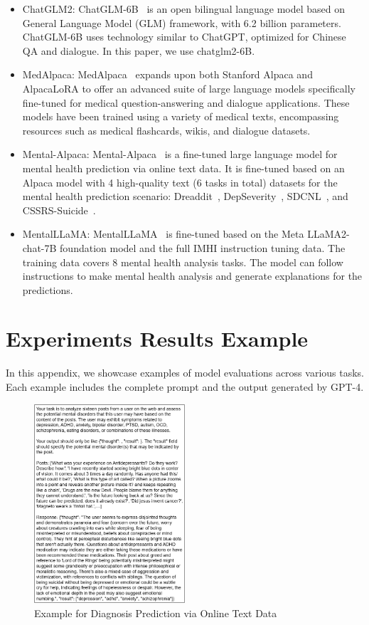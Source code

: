 \begin{itemize}
\item ChatGLM2: ChatGLM-6B~\citep{du2022glm, zeng2022glm} is an open bilingual language model based on General Language Model (GLM) framework, with 6.2 billion parameters. ChatGLM-6B uses technology similar to ChatGPT, optimized for Chinese QA and dialogue. In this paper, we use chatglm2-6B.
\item MedAlpaca: MedAlpaca~\citep{han2023medalpaca} expands upon both Stanford Alpaca and AlpacaLoRA to offer an advanced suite of large language models specifically fine-tuned for medical question-answering and dialogue applications. These models have been trained using a variety of medical texts, encompassing resources such as medical flashcards, wikis, and dialogue datasets.
\item Mental-Alpaca: Mental-Alpaca~\citep{xu2023leveraging} is a fine-tuned large language model for mental health prediction via online text data. It is fine-tuned based on an Alpaca model with 4 high-quality text (6 tasks in total) datasets for the mental health prediction scenario: Dreaddit~\citep{turcan-mckeown-2019-dreaddit}, DepSeverity~\citep{naseem2022early}, SDCNL~\citep{haque2021deep}, and CSSRS-Suicide~\citep{gaur2019knowledge}.
\item MentalLLaMA: MentalLLaMA~\citep{yang2023mentallama} is fine-tuned based on the Meta LLaMA2-chat-7B foundation model and the full IMHI instruction tuning data. The training data covers 8 mental health analysis tasks. The model can follow instructions to make mental health analysis and generate explanations for the predictions.
\end{itemize}

\section{Experiments Results Example}
\label{app: result example}
In this appendix, we showcase examples of model evaluations across various tasks. Each example includes the complete prompt and the output generated by GPT-4.
\begin{figure}[htpb]
    \centering
    \includegraphics[width=0.5\textwidth]{Figure/SMHD_example.png}
    \caption{Example for Diagnosis Prediction via Online Text Data}
\end{figure}

